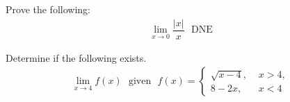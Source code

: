 \begin{exercise}
Prove the following:
\begin{align*}
    \lim_{x \longrightarrow 0} \dfrac{\lvert x \rvert}{x} \hspace{8pt} \text{DNE}
\end{align*}
\end{exercise}

\begin{exercise}
Determine if the following exists.
\begin{align*}
    \lim_{x \longrightarrow 4} f(x) \hspace{8pt} \text{given} \hspace{8pt} f(x) = 
    \begin{cases}
    \sqrt{x-4}, \hspace{4pt} &x > 4,\\[2ex]
    8-2x, \hspace{4pt} &x < 4
    \end{cases}
\end{align*}
\end{exercise}
